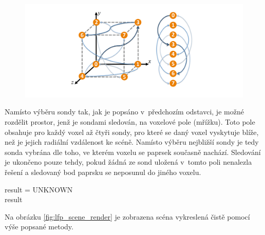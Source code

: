 \begin{figure}[H]
	\centering
	\includegraphics[scale=1]{images/probe_cube.png}
	\captionsetup{justification=centering}
	\label{fig:lfp_cube}
\end{figure}

Namísto výběru sondy tak, jak je popsáno v~předchozím odstavci, je možné rozdělit prostor, jenž je sondami sledován, na voxelové pole (mřížku). Toto pole obsahuje pro každý voxel až čtyři sondy, pro které se daný voxel vyskytuje blíže, než je jejich radiální vzdálenost ke scéně. Namísto výběru nejbližší sondy je tedy sonda vybrána dle toho, ve kterém voxelu se paprsek současně nachází. Sledování je ukončeno pouze tehdy, pokud žádná ze sond uložená v~tomto poli nenalezla řešení a sledovaný bod paprsku se neposunul do jiného voxelu. 

\begin{center}
	\begin{czechalgorithm}[H] \label{alg:light_field_trace}
	    result = UNKNOWN\\
	    \KwRet result
		\caption{Sledování paprsku skrze light field}
	\end{czechalgorithm}
\end{center}

Na obrázku \ref{fig:lfp_scene_render} je zobrazena scéna vykreslená čistě pomocí výše popsané metody.


